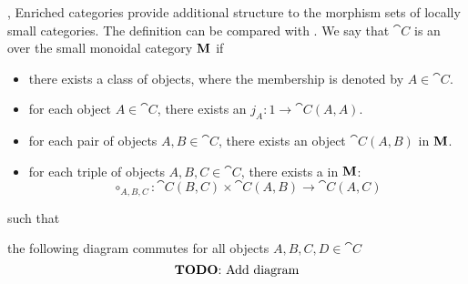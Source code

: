 \begin{definition}\label{def:enriched_category},\cite{nLab:enriched_category}
  Enriched categories provide additional structure to the morphism sets of locally small categories. The definition can be compared with . We say that \( \cat{C} \) is an  over the small monoidal category \( \operatorname{\mathbf{M}} \) if
  \begin{itemize}
    \item there exists a class of objects, where the membership is denoted by \( A \in \cat{C} \).
    \item for each object \( A \in \cat{C} \), there exists an  \( j_A: 1 \to \cat{C}(A, A) \).
    \item for each pair of objects \( A, B \in \cat{C} \), there exists an object \( \cat{C}(A, B) \) in \( \operatorname{\mathbf{M}} \).
    \item for each triple of objects \( A, B, C \in \cat{C} \), there exists a  in \( \operatorname{\mathbf{M}} \):
          \begin{equation*}
            \circ_{A,B,C}: {\cat{C}}(B, C) \times {\cat{C}}(A, B) \to {\cat{C}}(A, C)
          \end{equation*}
  \end{itemize}
  such that
  \begin{thmenum}
    \item the following diagram commutes for all objects \( A, B, C, D \in \cat{C} \)
    \begin{equation*}
      \text{\todo{Add diagram}}\iffalse\begin{mplibcode}
        u := 2cm;

        beginfig(1);
        input metapost/graphs;

        v1 := thelabel("$C(A, D)$", origin);
        v2 := thelabel("$C(C, D) \otimes C(A, C)$", (-2, -1) scaled u);
        v3 := thelabel("$C(C, D) \otimes (C(B, C) \otimes C(A, B))$", (-2, -2) scaled u);
        v4 := thelabel("$C(B, D) \otimes C(A, B)$", (2, -1) scaled u);
        v5 := thelabel("$(C(C, D) \otimes C(B, C)) \otimes C(A, B)$", (2, -2) scaled u);

        a1 := straight_arc(v2, v1);
        a2 := straight_arc(v4, v1);
        a3 := straight_arc(v2, v3);
        a4 := straight_arc(v5, v4);
        a5 := straight_arc(v3, v5);

        draw_vertices(v);
        draw_arcs(a);

        label.ulft("$\circ_{A, C, D}$", straight_arc_midpoint of a1);
        label.urt("$\circ_{A, B, D}$", straight_arc_midpoint of a2);
        label.lft("$\id \otimes \circ_{A, B, C}$", straight_arc_midpoint of a3);
        label.rt("$\circ_{B, C, D} \otimes \id$", straight_arc_midpoint of a4);
        label.bot("$\sigma$", straight_arc_midpoint of a5);
        endfig;
      \end{mplibcode}\fi
    \end{equation*}


\end{thmenum}
\end{definition}
